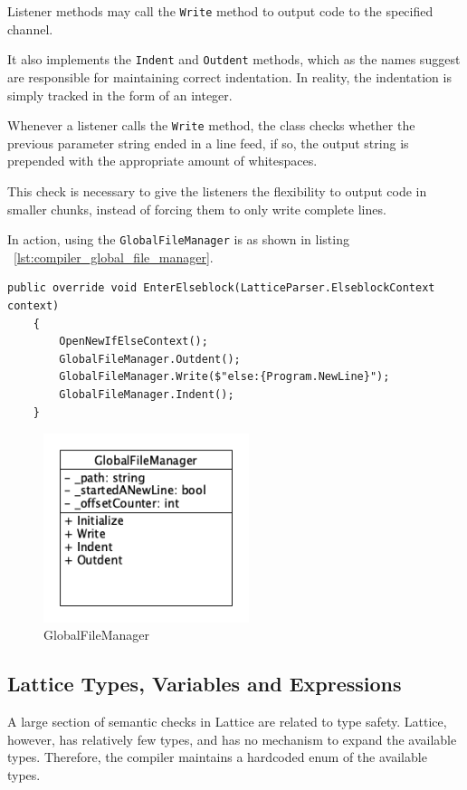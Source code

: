 Listener methods may call the \lstinline{Write} method to output code to the specified channel.

It also implements the \lstinline{Indent} and \lstinline{Outdent} methods, which as the names suggest are responsible
for maintaining correct indentation.
In reality, the indentation is simply tracked in the form of an integer.

Whenever a listener calls the \lstinline{Write} method, the class checks whether the previous parameter string ended
in a line feed, if so, the output string is prepended with the appropriate amount of whitespaces.

This check is necessary to give the listeners the flexibility to output code in smaller chunks, instead of forcing
them to only write complete lines.

In action, using the \lstinline{GlobalFileManager} is as shown in listing ~\ref{lst:compiler_global_file_manager}.

\begin{lstlisting}[caption={Using the GlobalFileManager to enter an else block},captionpos=b, label={lst:compiler_global_file_manager}]
    public override void EnterElseblock(LatticeParser.ElseblockContext context)
    {
        OpenNewIfElseContext();
        GlobalFileManager.Outdent();
        GlobalFileManager.Write($"else:{Program.NewLine}");
        GlobalFileManager.Indent();
    }
\end{lstlisting}

\begin{figure}[H]
    \centering
    \includegraphics[width=6cm]{figures/implementation_section/globalfilemanager}
    \caption{GlobalFileManager}
    \label{fig:global_file_manager}
\end{figure}

\subsection{Lattice Types, Variables and Expressions}
A large section of semantic checks in Lattice are related to type safety.
Lattice, however, has relatively few types, and has no mechanism to expand the available types.
Therefore, the compiler maintains a hardcoded enum of the available types.

